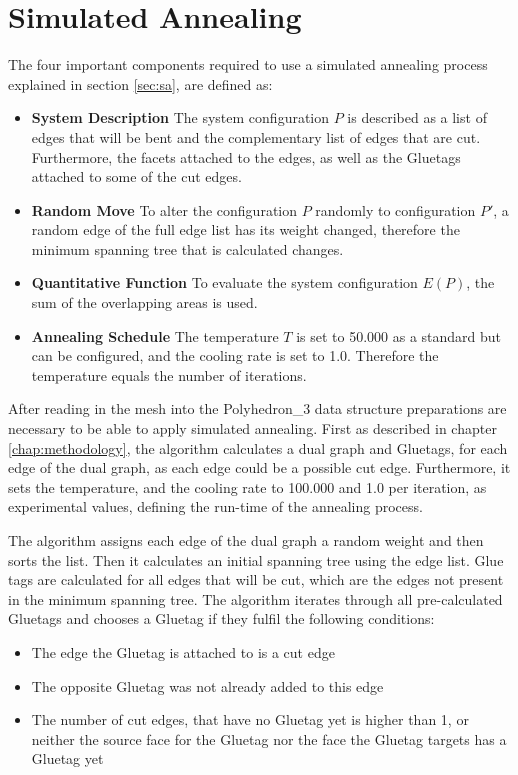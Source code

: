 \documentclass[draft,final]{vutinfth} %
\begin{document}
\section{Simulated Annealing}
\label{sec:annealing}
The four important components required to use a simulated annealing process explained in section \ref{sec:sa}, are defined as:
\begin{itemize}
    \item \textbf{System Description} The system configuration $P$ is described as a list of edges that will be bent and the complementary list of edges that are cut. Furthermore, the facets attached to the edges, as well as the Gluetags attached to some of the cut edges.
    \item \textbf{Random Move} To alter the configuration $P$ randomly to configuration $P'$, a random edge of the full edge list has its weight changed, therefore the minimum spanning tree that is calculated changes.
    \item \textbf{Quantitative Function} To evaluate the system configuration $E(P)$, the sum of the overlapping areas is used.
    \item \textbf{Annealing Schedule} The temperature $T$ is set to 50.000 as a standard but can be configured, and the cooling rate is set to 1.0. Therefore the temperature equals the number of iterations.
\end{itemize}

After reading in the mesh into the Polyhedron\_3 data structure preparations are necessary to be able to apply simulated annealing. First as described in chapter \ref{chap:methodology}, the algorithm calculates a dual graph and Gluetags, for each edge of the dual graph, as each edge could be a possible cut edge. Furthermore, it sets the temperature, and the cooling rate to 100.000 and 1.0 per iteration, as experimental values, defining the run-time of the annealing process.

The algorithm assigns each edge of the dual graph a random weight and then sorts the list. Then it calculates an initial spanning tree using the edge list. Glue tags are calculated for all edges that will be cut, which are the edges not present in the minimum spanning tree. The algorithm iterates through all pre-calculated Gluetags and chooses a Gluetag if they fulfil the following conditions:

\begin{itemize}
    \item The edge the Gluetag is attached to is a cut edge
    \item The opposite Gluetag was not already added to this edge
    \item The number of cut edges, that have no Gluetag yet is higher than 1, or neither the source face for the Gluetag nor the face the Gluetag targets has a Gluetag yet
\end{itemize}
\end{document}
